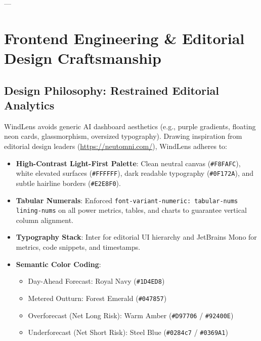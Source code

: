 \documentclass[11pt,a4paper]{article}
\begin{document}
---

\section{Frontend Engineering \& Editorial Design Craftsmanship}

\subsection{Design Philosophy: Restrained Editorial Analytics}
WindLens avoids generic AI dashboard aesthetics (e.g., purple gradients, floating neon cards, glassmorphism, oversized typography). Drawing inspiration from editorial design leaders (\url{https://neutomni.com/}), WindLens adheres to:
\begin{itemize}[leftmargin=*]
    \item \textbf{High-Contrast Light-First Palette}: Clean neutral canvas (\texttt{\#F8FAFC}), white elevated surfaces (\texttt{\#FFFFFF}), dark readable typography (\texttt{\#0F172A}), and subtle hairline borders (\texttt{\#E2E8F0}).
    \item \textbf{Tabular Numerals}: Enforced \texttt{font-variant-numeric: tabular-nums lining-nums} on all power metrics, tables, and charts to guarantee vertical column alignment.
    \item \textbf{Typography Stack}: Inter for editorial UI hierarchy and JetBrains Mono for metrics, code snippets, and timestamps.
    \item \textbf{Semantic Color Coding}:
    \begin{itemize}
        \item Day-Ahead Forecast: Royal Navy (\texttt{\#1D4ED8})
        \item Metered Outturn: Forest Emerald (\texttt{\#047857})
        \item Overforecast (Net Long Risk): Warm Amber (\texttt{\#D97706} / \texttt{\#92400E})
        \item Underforecast (Net Short Risk): Steel Blue (\texttt{\#0284c7} / \texttt{\#0369A1})
    \end{itemize}
\end{itemize}
\end{document}
